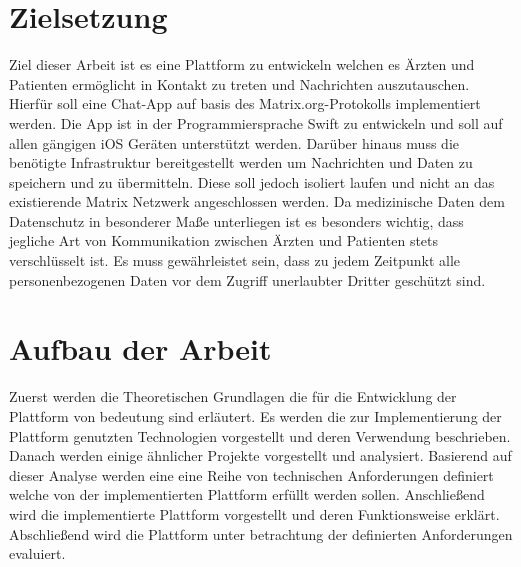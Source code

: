     \newpage
    \section{Zielsetzung}\label{sec:zielsetzung}
    Ziel dieser Arbeit ist es eine Plattform zu entwickeln welchen es Ärzten und Patienten ermöglicht in Kontakt zu treten und Nachrichten auszutauschen.
    Hierfür soll eine Chat-App auf basis des Matrix.org-Protokolls implementiert werden.
    Die App ist in der Programmiersprache Swift zu entwickeln und soll auf allen gängigen iOS Geräten unterstützt werden.
    Darüber hinaus muss die benötigte Infrastruktur bereitgestellt werden um Nachrichten und Daten zu speichern und zu übermitteln.
    Diese soll jedoch isoliert laufen und nicht an das existierende Matrix Netzwerk angeschlossen werden.
    Da medizinische Daten dem Datenschutz in besonderer Maße unterliegen ist es besonders wichtig,
    dass jegliche Art von Kommunikation zwischen Ärzten und Patienten stets verschlüsselt ist.
    Es muss gewährleistet sein, dass zu jedem Zeitpunkt alle personenbezogenen Daten vor dem Zugriff unerlaubter Dritter geschützt sind.

    \section{Aufbau der Arbeit}\label{sec:aufbau-der-arbeit}
    Zuerst werden die Theoretischen Grundlagen die für die Entwicklung der Plattform von bedeutung sind erläutert.
    Es werden die zur Implementierung der Plattform genutzten Technologien vorgestellt und deren Verwendung beschrieben.
    Danach werden einige ähnlicher Projekte vorgestellt und analysiert.
    Basierend auf dieser Analyse werden eine eine Reihe von technischen Anforderungen definiert welche von der implementierten Plattform erfüllt werden sollen.
    Anschließend wird die implementierte Plattform vorgestellt und deren Funktionsweise erklärt.
    Abschließend wird die Plattform unter betrachtung der definierten Anforderungen evaluiert.


